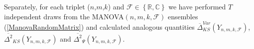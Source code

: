 \documentclass[a4paper,12pt]{article}
\newcommand{\R}{\ensuremath{\mathbb{R}}}
\newcommand{\C}{\ensuremath{\mathbb{C}}}
\newcommand{\Fc}{\ensuremath{\mathcal{F}}}
\newcommand{\m}{m}
\newcommand{\specstat}{\ensuremath{\Psi}}
\begin{document}
Separately, 
for each triplet ($n$,$m$,$k$) and $\Fc\in\left\{ \R,\C \right\}$
we have performed $T$ independent draws from
the MANOVA$(n,\m,k,\Fc)$ ensembles 
(\ref{ManovaRandomMatrix}) and calculated 
analogous quantities 
$\overline{\Delta}^{Var}_{KS}(Y_{n,\m,k,\Fc})$,
$\overline{\Delta^2}_{KS}(Y_{n,\m,k,\Fc})$ 
and
$\overline{\Delta^2}_{\specstat}(Y_{n,\m,k,\Fc})$.








\end{document}
